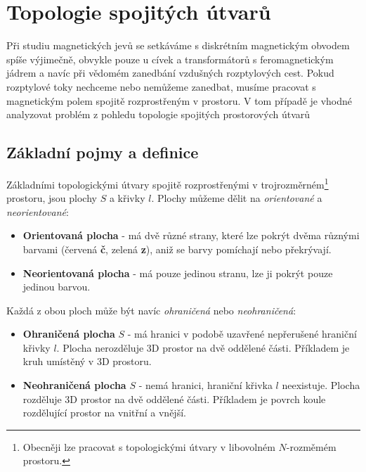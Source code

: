   \section{Topologie spojitých útvarů}\label{teo:IchapIIIsecII}
    Při studiu magnetických jevů se setkáváme s diskrétním magnetickým obvodem spíše výjimečně, 
    obvykle pouze u cívek a transformátorů s feromagnetickým jádrem a navíc při vědomém zanedbání 
    vzdušných rozptylových cest. Pokud rozptylové toky nechceme nebo nemůžeme zanedbat, musíme 
    pracovat s magnetickým polem spojitě rozprostřeným v prostoru. V tom případě je vhodné 
    analyzovat problém z pohledu topologie spojitých prostorových útvarů
      
    \subsection{Základní pojmy a definice}\label{teo:IchapIIsecIIsubI}
      Základními topologickými útvary spojitě rozprostřenými v trojrozměrném\footnote{Obecněji lze 
      pracovat s topologickými útvary v libovolném \(N\)-rozměmém prostoru.} prostoru, jsou      
      plochy \(S\) a křivky \(l\). Plochy můžeme dělit na \emph{orientované} a \emph{neorientované}:
      \begin{itemize}[noitemsep]
        \item \textbf{Orientovaná plocha} - má dvě různé strany, které lze pokrýt dvěma různými 
               barvami (červená \textbf{č}, zelená \textbf{z}), aniž se barvy pomíchají nebo 
               překrývají.
        \item \textbf{Neorientovaná plocha} - má pouze jedinou stranu, lze ji pokrýt pouze jedinou 
              barvou.
      \end{itemize}
      
      Každá z obou ploch může být navíc \emph{ohraničená} nebo \emph{neohraničená}:
      \begin{itemize}[noitemsep]
        \item \textbf{Ohraničená plocha} \(S\) - má hranici v podobě uzavřené nepřerušené hraniční 
             křivky \(l\). Plocha nerozděluje 3D prostor na dvě oddělené části. Příkladem je kruh 
             umístěný v 3D prostoru.
        \item \textbf{Neohraničená plocha} \(S\) - nemá hranici, hraniční křivka \(l\) neexistuje. 
              Plocha rozděluje 3D prostor na dvě oddělené části. Příkladem je povrch koule 
              rozdělující prostor na vnitřní a vnější.
      \end{itemize}
      
